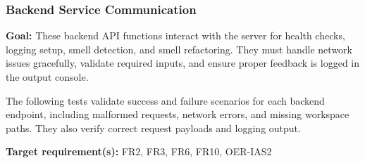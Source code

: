 \documentclass[12pt, titlepage]{article}
\begin{document}
\subsubsection{Backend Service Communication}

\textbf{Goal:} These backend API functions interact with the server for health checks, logging setup, smell detection, and smell refactoring. They must handle network issues gracefully, validate required inputs, and ensure proper feedback is logged in the output console.

\medskip

\noindent The following tests validate success and failure scenarios for each backend endpoint, including malformed requests, network errors, and missing workspace paths. They also verify correct request payloads and logging output.

\medskip

\noindent\textbf{Target requirement(s):} FR2, FR3, FR6, FR10, OER-IAS2~\cite{SRS}
\end{document}
